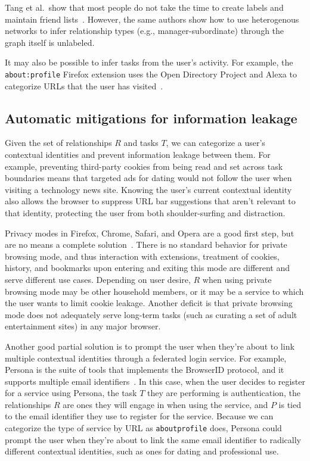 \documentclass{llncs}
\begin{document}
Tang et al.~show that most people do not take the time to create labels and
maintain friend lists~\cite{tang}. However, the same authors show how to use
heterogenous networks to infer relationship types (e.g., manager-subordinate)
through the graph itself is unlabeled.

It may also be possible to infer tasks from the user's activity. For example,
the \texttt{about:profile} Firefox extension uses the Open Directory Project
and Alexa to categorize URLs that the user has visited~\cite{aboutprofile}.

\subsection{Automatic mitigations for information leakage}
Given the set of relationships $R$ and tasks $T$, we can categorize a user's
contextual identities and prevent information leakage between them.  For
example, preventing third-party cookies from being read and set across task
boundaries means that targeted ads for dating would not follow the user when
visiting a technology news site. Knowing the user's current contextual identity
also allows the browser to suppress URL bar suggestions that aren't relevant to
that identity, protecting the user from both shoulder-surfing and distraction.

Privacy modes in Firefox, Chrome, Safari, and Opera are a good first step, but
are no means a complete solution~\cite{ABBJ10}. There is no standard behavior
for private browsing mode, and thus interaction with extensions, treatment of
cookies, history, and bookmarks upon entering and exiting this mode are
different and serve different use cases. Depending on user desire, $R$ when
using private browsing mode may be other household members, or it may be a
service to which the user wants to limit cookie leakage. Another deficit is
that private browsing mode does not adequately serve long-term tasks (such as
curating a set of adult entertainment sites) in any major browser.

Another good partial solution is to prompt the user when they're about to link
multiple contextual identities through a federated login service. For example,
Persona is the suite of tools that implements the BrowserID protocol, and it
supports multiple email identifiers~\cite{browserid}. In this case, when the
user decides to register for a service using Persona, the task $T$ they are
performing is authentication, the relationships $R$ are ones they will engage
in when using the service, and $P$ is tied to the email identifier they use to
register for the service. Because we can categorize the type of service by URL
as \texttt{aboutprofile} does, Persona could prompt the user when they're about
to link the same email identifier to radically different contextual identities,
such as ones for dating and professional use.
\end{document}
